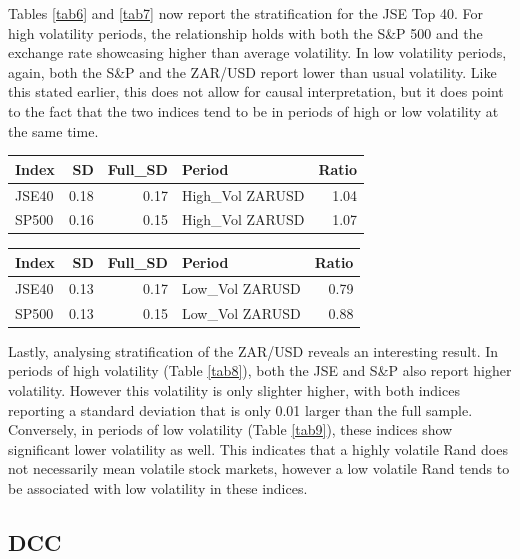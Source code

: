\documentclass[11pt,preprint, authoryear]{elsarticle}
\let\origtable\table
\let\endorigtable\endtable
\renewenvironment{table}[1][2] {
    \expandafter\origtable\expandafter[H]
} {
    \endorigtable
}
\numberwithin{equation}{section}
\numberwithin{figure}{section}
\numberwithin{table}{section}
\begin{document}
Tables \ref{tab6} and \ref{tab7} now report the stratification for the
JSE Top 40. For high volatility periods, the relationship holds with
both the S\&P 500 and the exchange rate showcasing higher than average
volatility. In low volatility periods, again, both the S\&P and the
ZAR/USD report lower than usual volatility. Like this stated earlier,
this does not allow for causal interpretation, but it does point to the
fact that the two indices tend to be in periods of high or low
volatility at the same time.

\begin{table}[H]
\centering
\caption{ZAR/USD High Volatility \label{tab8}} 
\begin{tabular}{lrrlr}
  \hline
Index & SD & Full\_SD & Period & Ratio \\ 
  \hline
JSE40 & 0.18 & 0.17 & High\_Vol ZARUSD & 1.04 \\ 
  SP500 & 0.16 & 0.15 & High\_Vol ZARUSD & 1.07 \\ 
   \hline
\end{tabular}
\end{table}
\begin{table}[H]
\centering
\caption{ZAR/USD Low Volatility \label{tab9}} 
\begin{tabular}{lrrlr}
  \hline
Index & SD & Full\_SD & Period & Ratio \\ 
  \hline
JSE40 & 0.13 & 0.17 & Low\_Vol ZARUSD & 0.79 \\ 
  SP500 & 0.13 & 0.15 & Low\_Vol ZARUSD & 0.88 \\ 
   \hline
\end{tabular}
\end{table}

Lastly, analysing stratification of the ZAR/USD reveals an interesting
result. In periods of high volatility (Table \ref{tab8}), both the JSE
and S\&P also report higher volatility. However this volatility is only
slighter higher, with both indices reporting a standard deviation that
is only 0.01 larger than the full sample. Conversely, in periods of low
volatility (Table \ref{tab9}), these indices show significant lower
volatility as well. This indicates that a highly volatile Rand does not
necessarily mean volatile stock markets, however a low volatile Rand
tends to be associated with low volatility in these indices.

\hypertarget{dcc}{%
\subsection{DCC}\label{dcc}}
\end{document}
